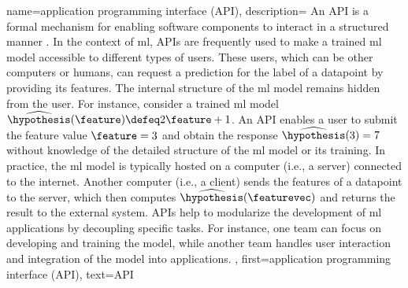 {{ 
{name={application programming interface (API)},
		description={
			An  API is a formal mechanism for enabling 
			software components to interact in a structured manner \cite{RestfulBook2013}. In the 
			context of \gls{ml}, APIs are frequently used to make a trained \gls{ml} \gls{model} 
			accessible to different types of users. These users, which can be other computers 
			or humans, can request a \gls{prediction} for the \gls{label} of a \gls{datapoint} by 
			providing its \gls{feature}s. The internal structure of the \gls{ml} 
			\gls{model} remains hidden from the user. For instance, consider a trained \gls{ml} \gls{model}  
			$\widehat{\hypothesis}(\feature) \defeq  2 \feature+1$. An API enables a user to 
			submit the \gls{feature} value $\feature=3$ and obtain the response $\widehat{\hypothesis}(3)=7$ 
			without knowledge of the detailed structure of the \gls{ml} \gls{model} or its training. 
			In practice, the \gls{ml} \gls{model} is typically hosted on a computer (i.e., a server) connected to the internet. 
			Another computer (i.e., a client) sends the \gls{feature}s of a \gls{datapoint} to the 
			server, which then computes $\widehat{\hypothesis}(\featurevec)$ and returns the 
			result to the external system. APIs help to modularize the development of 
			\gls{ml} applications by decoupling specific tasks. For instance, one team can 
			focus on developing and training the \gls{model}, while another team handles 
			user interaction and integration of the \gls{model} into applications.
			},
		first={application programming interface (API)},
		text={API}
}





	
}}
